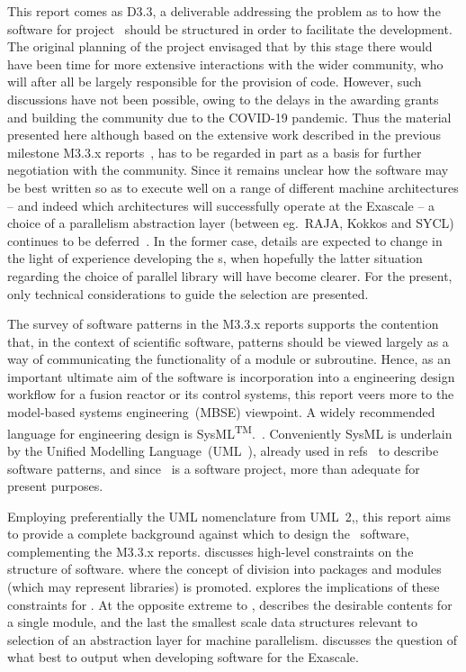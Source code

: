 This report comes as D3.3, a deliverable addressing the problem as to how the software
for project \nep\ should be structured in order to facilitate the development.
The original planning of the project envisaged that by this stage
there would have been time for more extensive interactions 
with the wider community, who will after all be largely responsible for the
provision of code.
However, such discussions have not been possible, owing
to the delays in the awarding grants and building the
community due to the COVID-19 pandemic.
Thus the material presented here
although based on the extensive work described in the previous milestone M3.3.x
reports~\cite{y1re331,y2re332,y2re333}, has to be regarded in part as a basis for further
negotiation with the community. Since it remains unclear how the software may be
best written so as to execute well on a range of different machine architectures -- and indeed
which architectures will successfully operate at the Exascale -- 
a choice of a parallelism abstraction layer (between eg.\ RAJA, Kokkos and SYCL)
continues to be  deferred~\cite[\S\,3.2]{y2re333}.
In the former case, details are expected to change in the light
of experience developing the \papp s, when hopefully the latter situation regarding the
choice of parallel library will have become clearer.
For the present, only  technical considerations to guide the selection
are presented. 

The survey of software patterns in the M3.3.x reports supports the contention that, in
the context of scientific software, patterns
should be viewed largely as a way of communicating the functionality of a module or subroutine.
Hence, as an important ultimate aim of the software is incorporation into a engineering design workflow
for a fusion reactor or its control systems, this report veers more to the model-based systems
engineering~(MBSE) viewpoint. A widely recommended language for
engineering design  is SysML\textsuperscript{TM}.~\cite{friedenthaletal}.
Conveniently SysML is underlain by the Unified Modelling
Language~(UML~\cite{omgumlwebsite}), already used in
refs~\cite{y2re332,y2re333} to describe software patterns, and
since \nep\ is a software project, more than adequate for present purposes.

Employing preferentially the UML nomenclature from UML~2,,
this report aims to provide a complete background against which to 
design the \nep\ software, complementing the M3.3.x reports.
 discusses high-level constraints on the structure of software.
where the concept of division into packages and modules (which may represent libraries)  is promoted.
 explores the implications of these constraints for \nep.
At the opposite extreme to ,
 describes the desirable contents for a single module,
and the last  the smallest scale data structures relevant to selection
of an abstraction layer for machine parallelism.
 discusses the question of what best to output when developing 
software for the Exascale.

